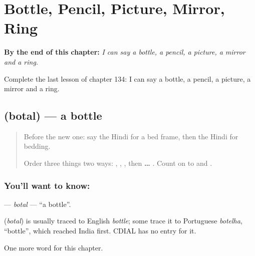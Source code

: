 
\chapter{Bottle, Pencil, Picture, Mirror, Ring}
\label{ch:hi-bottle-pencil-picture-mirror-ring}

\begin{chapteropening}
\textbf{By the end of this chapter:} \emph{I can say a bottle, a pencil, a picture, a mirror and a ring.}

Complete the last lesson of chapter 134: I can say a bottle, a pencil, a picture, a mirror and a ring.
\end{chapteropening}

\section[\texorpdfstring{\hi{बोतल} (botal)}{बोतल (botal)}]{ (botal) — a bottle}

\label{lesson:HI-C134-botal}



\begin{quote}
Before the new one: say the Hindi for a bed frame, then the Hindi for bedding.

Order three things two ways: \textbf{}, \textbf{}, \textbf{}, then \textbf{ … }. Count on to \textbf{} and \textbf{}.
\end{quote}

\subsection*{You'll want to know: }
\textbf{} — \emph{botal} — \textquotedblleft{}a bottle\textquotedblright{}.

\begin{cousinweb}
\textbf{} (\emph{botal}) is usually traced to English \emph{bottle}; some trace it to Portuguese \emph{botelha}, \textquotedblleft{}bottle\textquotedblright{}, which reached India first. CDIAL has no entry for it.
\end{cousinweb}

\begin{grammarlens}[title={What you've built}]
One more word for this chapter.
\end{grammarlens}

